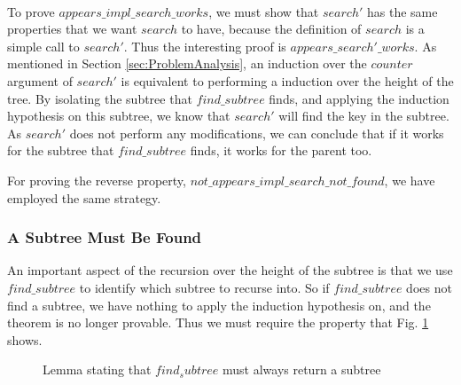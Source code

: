 \paragraph{}
To prove $appears\_impl\_search\_works$, we must show that $search'$ has the same properties that we want $search$ to have, because the definition of $search$ is a simple call to $search'$. Thus the interesting proof is $appears\_search'\_works$. As mentioned in Section \ref{sec:ProblemAnalysis}, an induction over the $counter$ argument of $search'$ is equivalent to performing a induction over the height of the tree. By isolating the subtree that $find\_subtree$ finds, and applying the induction hypothesis on this subtree, we know that $search'$ will find the key in the subtree. As $search'$ does not perform any modifications, we can conclude that if it works for the subtree that $find\_subtree$ finds, it works for the parent too. 

For proving the reverse property, $not\_appears\_impl\_search\_not\_found$, we have employed the same strategy.

\subsubsection{A Subtree Must Be Found}
An important aspect of the recursion over the height of the subtree is that we use $find\_subtree$ to identify which subtree to recurse into. So if $find\_subtree$ does not find a subtree, we have nothing to apply the induction hypothesis on, and the theorem is no longer provable. Thus we must require the property that Fig. \ref{fig:find_must_find} shows.

\begin{figure}
  
  \label{fig:find_must_find}
  \caption{Lemma stating that $find_subtree$ must always return a subtree}
\end{figure}

